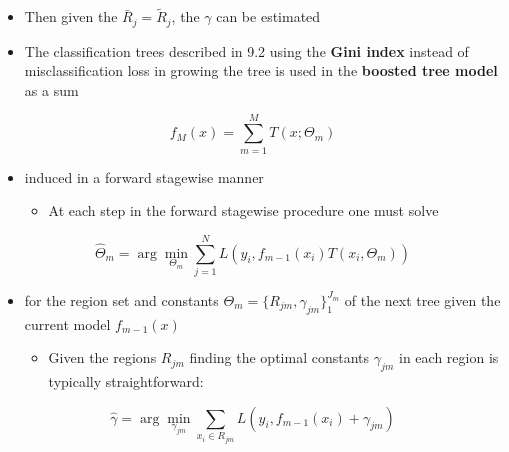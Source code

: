 \documentclass[11pt]{article}
\begin{document}
\begin{itemize}
\item Then given the \(\bar R_j = \tilde R_j\), the \(\gamma\) can be estimated

\item The classification trees described in 9.2 using the \textbf{Gini index} instead of misclassification loss in growing the tree is used in the \textbf{boosted tree model} as a sum
\end{itemize}
\begin{equation}
  f_M(x) = \sum_{m=1}^MT(x; \Theta_m)
\end{equation}
\begin{itemize}
\item induced in a forward stagewise manner
\begin{itemize}
\item At each step in the forward stagewise procedure one must solve
\end{itemize}
\end{itemize}
\begin{equation}
	  \hat \Theta_m = \arg \min_{\Theta_m} \sum_{j=1}^N L(y_i, f_{m-1}(x_i)T(x_i, \Theta_m))
\end{equation}	
\begin{itemize}
\item for the region set and constants \(\Theta_m = \{R_{jm}, \gamma_{jm}\}_1^{J_m}\) of the next tree given the current model \(f_{m-1}(x)\)
\begin{itemize}
\item Given the regions \(R_{jm}\) finding the optimal constants \(\gamma_{jm}\) in each region is typically straightforward:
\end{itemize}
\end{itemize}
\begin{equation}
  \hat \gamma = \arg \min_{\gamma_{jm}} \sum_{x_i \in R_{jm}} L(y_i, f_{m-1}(x_i)+\gamma_{jm})
\end{equation}
\end{document}
